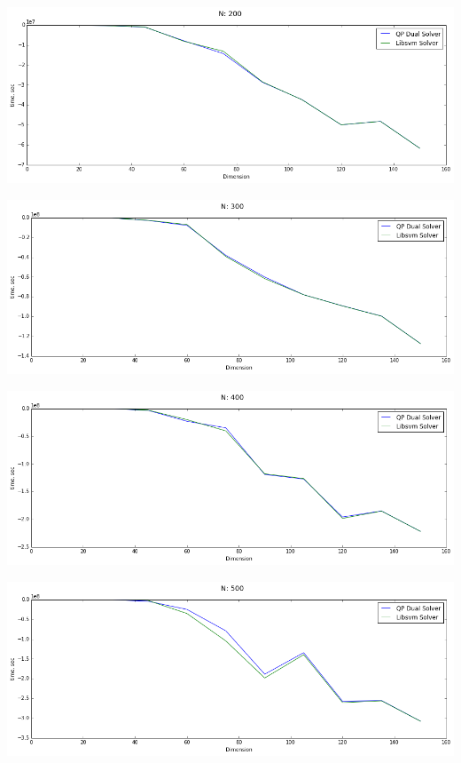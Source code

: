 \documentclass[12pt, a4paper]{article}
\begin{document}
			\begin{center}
				\includegraphics[width=18cm]{2par_obj_N200_one.png}
			\end{center}

			\begin{center}
				\includegraphics[width=18cm]{2par_obj_N300_one.png}
			\end{center}

			\begin{center}
				\includegraphics[width=18cm]{2par_obj_N400_one.png}
			\end{center}

			\begin{center}
				\includegraphics[width=18cm]{2par_obj_N500_one.png}
			\end{center}
\end{document}
